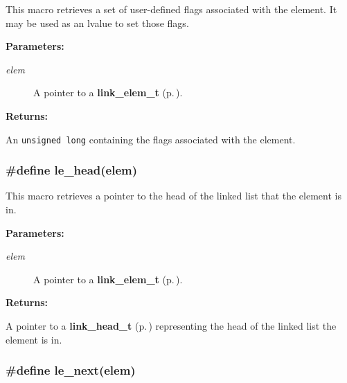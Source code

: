  This macro retrieves a set of user-defined flags associated with the element. It may be used as an lvalue to set those flags.\begin{Desc}
\item[{\bf Parameters: }]\par
\begin{description}
\item[
{\em elem}]A pointer to a {\bf link\_\-elem\_\-t} {\rm (p.\,\pageref{group__dbprim__link_a1})}.

\end{description}
\end{Desc}
\begin{Desc}
\item[{\bf Returns: }]\par
An {\tt unsigned long} containing the flags associated with the element. \end{Desc}
\subsubsection{\setlength{\rightskip}{0pt plus 5cm}\#define le\_\-head(elem)}\label{group__dbprim__link_a24}




 This macro retrieves a pointer to the head of the linked list that the element is in.\begin{Desc}
\item[{\bf Parameters: }]\par
\begin{description}
\item[
{\em elem}]A pointer to a {\bf link\_\-elem\_\-t} {\rm (p.\,\pageref{group__dbprim__link_a1})}.

\end{description}
\end{Desc}
\begin{Desc}
\item[{\bf Returns: }]\par
A pointer to a {\bf link\_\-head\_\-t} {\rm (p.\,\pageref{group__dbprim__link_a0})} representing the head of the linked list the element is in. \end{Desc}
\subsubsection{\setlength{\rightskip}{0pt plus 5cm}\#define le\_\-next(elem)}\label{group__dbprim__link_a21}




